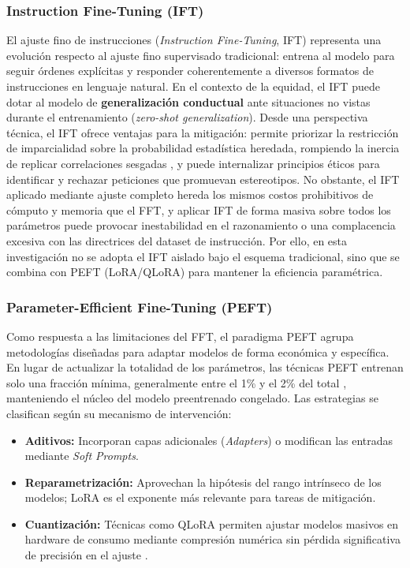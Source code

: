 \documentclass[12pt,a4paper]{report}
\begin{document}
\subsubsection{Instruction Fine-Tuning (IFT)}
\label{subsubsec:ift}

El ajuste fino de instrucciones (\textit{Instruction Fine-Tuning}, IFT) representa una evolución respecto al ajuste fino supervisado tradicional: entrena al modelo para seguir órdenes explícitas y responder coherentemente a diversos formatos de instrucciones en lenguaje natural. En el contexto de la equidad, el IFT puede dotar al modelo de \textbf{generalización conductual} ante situaciones no vistas durante el entrenamiento (\textit{zero-shot generalization}). Desde una perspectiva técnica, el IFT ofrece ventajas para la mitigación: permite priorizar la restricción de imparcialidad sobre la probabilidad estadística heredada, rompiendo la inercia de replicar correlaciones sesgadas \cite{raza_developing_2025}, y puede internalizar principios éticos para identificar y rechazar peticiones que promuevan estereotipos. No obstante, el IFT aplicado mediante ajuste completo hereda los mismos costos prohibitivos de cómputo y memoria que el FFT, y aplicar IFT de forma masiva sobre todos los parámetros puede provocar inestabilidad en el razonamiento o una complacencia excesiva con las directrices del dataset de instrucción. Por ello, en esta investigación no se adopta el IFT aislado bajo el esquema tradicional, sino que se combina con PEFT (LoRA/QLoRA) para mantener la eficiencia paramétrica.

\subsubsection{Parameter-Efficient Fine-Tuning (PEFT)}
\label{subsubsec:peft}

Como respuesta a las limitaciones del FFT, el paradigma PEFT agrupa metodologías diseñadas para adaptar modelos de forma económica y específica. En lugar de actualizar la totalidad de los parámetros, las técnicas PEFT entrenan solo una fracción mínima, generalmente entre el 1\% y el 2\% del total \cite{wang_parameter-efficient_2025}, manteniendo el núcleo del modelo preentrenado congelado. Las estrategias se clasifican según su mecanismo de intervención:

\begin{itemize}
    \item \textbf{Aditivos:} Incorporan capas adicionales (\textit{Adapters}) o modifican las entradas mediante \textit{Soft Prompts}.
    \item \textbf{Reparametrización:} Aprovechan la hipótesis del rango intrínseco de los modelos; LoRA es el exponente más relevante para tareas de mitigación.
    \item \textbf{Cuantización:} Técnicas como QLoRA permiten ajustar modelos masivos en hardware de consumo mediante compresión numérica sin pérdida significativa de precisión en el ajuste \cite{dettmers_qlora_2023}.
\end{itemize}
\end{document}
